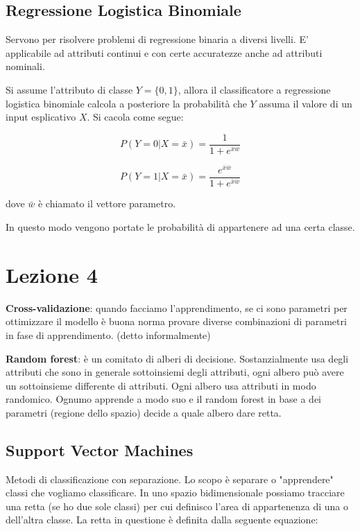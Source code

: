 \subsection{Regressione Logistica Binomiale}

Servono per risolvere problemi di regressione binaria a diversi livelli. E' applicabile ad attributi continui e con certe accuratezze anche ad attributi nominali.

Si assume l'attributo di classe $Y = \{0,1\}$, allora il classificatore a regressione logistica binomiale calcola a posteriore la probabilit\`a che $Y$ assuma il valore di un input esplicativo $X$. Si cacola come segue:

\[P(Y = 0 | X= \bar{x}) = \frac{1}{1+e^{\bar{x}  \bar{w}}}\]

\[P(Y = 1 | X= \bar{x}) = \frac{e^{\bar{x}  \bar{w}}}{1+e^{\bar{x}  \bar{w}}}\]

dove $\bar{w}$ \`e chiamato il vettore parametro.

In questo modo vengono portate le probabilità di appartenere ad una certa classe.	

\section{Lezione 4}

\textbf{Cross-validazione}: quando facciamo l'apprendimento, se ci sono parametri per ottimizzare il modello è buona norma provare diverse combinazioni di parametri in fase di apprendimento. (detto informalmente)

\textbf{Random forest}: \`e un comitato di alberi di decisione. Sostanzialmente usa degli attributi che sono in generale sottoinsiemi degli attributi, ogni albero può avere un sottoinsieme differente di attributi. Ogni albero usa attributi in modo randomico. Ognumo apprende a modo suo e il random forest in base a dei parametri (regione dello spazio) decide a quale albero dare retta. 

\subsection{Support Vector Machines}
Metodi di classificazione con separazione. Lo scopo \`e separare o "apprendere" classi che vogliamo classificare. In uno spazio bidimensionale possiamo tracciare una retta (se ho due sole classi) per cui definisco l'area di appartenenza di una o dell'altra classe. La retta in questione è definita dalla seguente equazione:

